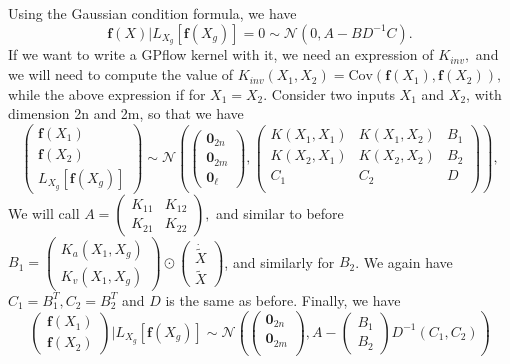 \documentclass{article}
\begin{document}
Using the Gaussian condition formula, we have
$$
\mathbf{f}(X) | L_{X_g}[\mathbf{f}(X_g)]=0 \sim \mathcal{N} \left(0, A-BD^{-1}C\right).
$$
If we want to write a GPflow kernel with it, 
we need an expression of $K_{inv},$ and we will need to compute the value of $K_{inv}(X_1, X_2)=\mathrm{Cov}(\mathbf{f}(X_1), \mathbf{f}(X_2)),$ while the above expression if for $X_1=X_2.$ 
Consider two inputs $X_1$ and $X_2$, with dimension 2n and 2m, so that we have 
$$
\begin{pmatrix}
  \mathbf{f}(X_1)\\\mathbf{f}(X_2) \\ L_{X_g}[\mathbf{f}(X_g)]
\end{pmatrix}
\sim \mathcal{N}
\left(
\begin{pmatrix}
  \mathbf{0}_{2n} \\ \mathbf{0}_{2m} \\ \mathbf{0}_{\ell}
\end{pmatrix},
\begin{pmatrix}
K(X_1, X_1) & K(X_1, X_2) & B_1 \\
K(X_2, X_1) & K(X_2, X_2) & B_2 \\
C_1         & C_2         & D \\
\end{pmatrix}
\right), 
$$
We will call $A=\begin{pmatrix}
  K_{11} & K_{12} \\ K_{21} & K_{22}
\end{pmatrix},$ and similar to before $B_1=\begin{pmatrix}
  K_a(X_1, X_g) \\ K_v(X_1, X_g) 
\end{pmatrix}\odot\begin{pmatrix}
  \dot{\tilde{X}} \\ \tilde{X}
\end{pmatrix}$, and similarly for $B_2$.
We again have $C_1=B_1^T, C_2=B_2^T$ and $D$ is the same as before.
Finally, we have 
$$
\begin{pmatrix}
  \mathbf{f}(X_1)\\
  \mathbf{f}(X_2)
\end{pmatrix}|L_{X_g}[\mathbf{f}(X_g)]
\sim\mathcal{N}
\left(
\begin{pmatrix}
  \mathbf{0}_{2n}\\
  \mathbf{0}_{2m}\\
\end{pmatrix}
,
A-\begin{pmatrix}
  B_1 \\B_2
\end{pmatrix}D^{-1}\left(C_1, C_2\right)
\right)
$$
\end{document}
